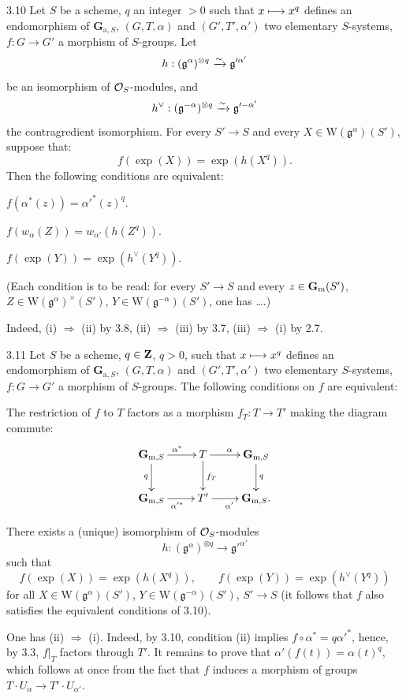 \begin{lemma}{3.10}\label{XX.3.10}
Let $S$ be a scheme, $q$ an integer $>0$ such that $x\longmapsto x^q$ defines an endomorphism of $\mathbf G_{\mathrm a,S}$, $(G,T,\alpha)$ and $(G',T',\alpha')$ two elementary $S$-systems, $f:G\to G'$ a morphism of $S$-groups. Let
\[
h:(\mathfrak g^\alpha)^{\otimes q}\xrightarrow{\sim}\mathfrak g'^{\alpha'}
\]
be an isomorphism of $\mathcal{O}_S$-modules, and
\[
h^\vee:(\mathfrak g^{-\alpha})^{\otimes q}\xrightarrow{\sim}\mathfrak g'^{-\alpha'}
\]
the contragredient isomorphism. For every $S'\to S$ and every $X\in\mathrm W(\mathfrak g^\alpha)(S')$, suppose that:
\[
f(\exp(X))=\exp(h(X^q)).
\]
Then the following conditions are equivalent:
\begin{enumeratei}
\item $f(\alpha^*(z))=\alpha'^*(z)^q$.
\item $f(w_\alpha(Z))=w_{\alpha'}(h(Z^q))$.
\item $f(\exp(Y))=\exp(h^\vee(Y^q))$.
\end{enumeratei}
(Each condition is to be read: for every $S'\to S$ and every $z\in\mathbf{G}_{\mathrm{m}}(S')$, $Z\in\mathrm W(\mathfrak g^\alpha)^\times(S')$, $Y\in\mathrm W(\mathfrak g^{-\alpha})(S')$, one has \ldots.)
\end{lemma}
Indeed, (i) $\Rightarrow$ (ii) by 3.8, (ii) $\Rightarrow$ (iii) by 3.7, (iii) $\Rightarrow$ (i) by 2.7.

\begin{proposition}{3.11}\label{XX.3.11}
Let $S$ be a scheme, $q\in\mathbf{Z}$, $q>0$, such that $x\longmapsto x^q$ defines an endomorphism of $\mathbf G_{\mathrm a,S}$, $(G,T,\alpha)$ and $(G',T',\alpha')$ two elementary $S$-systems, $f:G\to G'$ a morphism of $S$-groups. The following conditions on $f$ are equivalent:
\begin{enumeratei}
\item The restriction of $f$ to $T$ factors as a morphism $f_T:T\to T'$ making the diagram commute:
\[
\xymatrix{
\mathbf G_{\mathrm m,S}\ar[r]^{\alpha^*}\ar[d]_q&T\ar[r]^\alpha\ar[d]^{f_T}&\mathbf G_{\mathrm m,S}\ar[d]^q\\
\mathbf G_{\mathrm m,S}\ar[r]_{\alpha'^*}&T'\ar[r]_{\alpha'}&\mathbf G_{\mathrm m,S}.
}
\]
\item There exists a (unique) isomorphism of $\mathcal{O}_S$-modules
\[
h:(\mathfrak g^\alpha)^{\otimes q}\to\mathfrak g'^{\alpha'}
\]
such that
\[
f(\exp(X))=\exp(h(X^q)),\qquad f(\exp(Y))=\exp(h^\vee(Y^q))
\]
for all $X\in\mathrm W(\mathfrak g^\alpha)(S')$, $Y\in\mathrm W(\mathfrak g^{-\alpha})(S')$, $S'\to S$ (it follows that $f$ also satisfies the equivalent conditions of 3.10).
\end{enumeratei}
\end{proposition}
One has (ii) $\Rightarrow$ (i). Indeed, by 3.10, condition (ii) implies $f\circ\alpha^*=q\alpha'^*$, hence, by 3.3, $f|_T$ factors through $T'$. It remains to prove that $\alpha'(f(t))=\alpha(t)^q$, which follows at once from the fact that $f$ induces a morphism of groups $T\cdot U_\alpha\to T'\cdot U_{\alpha'}$.

